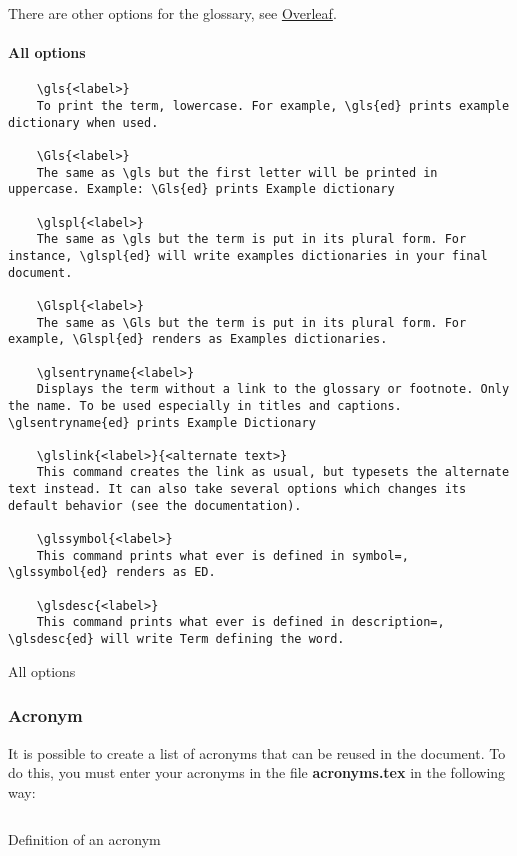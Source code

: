 There are other options for the glossary, see
\href{https://fr.overleaf.com/learn/latex/Glossaries}{Overleaf}.

\paragraph{All options}

\begin{code}
    \begin{verbatim}
    \gls{<label>}
    To print the term, lowercase. For example, \gls{ed} prints example dictionary when used.

    \Gls{<label>}
    The same as \gls but the first letter will be printed in uppercase. Example: \Gls{ed} prints Example dictionary

    \glspl{<label>}
    The same as \gls but the term is put in its plural form. For instance, \glspl{ed} will write examples dictionaries in your final document.

    \Glspl{<label>}
    The same as \Gls but the term is put in its plural form. For example, \Glspl{ed} renders as Examples dictionaries.

    \glsentryname{<label>}
    Displays the term without a link to the glossary or footnote. Only the name. To be used especially in titles and captions. \glsentryname{ed} prints Example Dictionary

    \glslink{<label>}{<alternate text>}
    This command creates the link as usual, but typesets the alternate text instead. It can also take several options which changes its default behavior (see the documentation).

    \glssymbol{<label>}
    This command prints what ever is defined in symbol=, \glssymbol{ed} renders as ED.

    \glsdesc{<label>}
    This command prints what ever is defined in description=, \glsdesc{ed} will write Term defining the word.
    \end{verbatim}
    \caption{All options}
\end{code}

\subsubsection{Acronym} \label{acronym}
It is possible to create a list of acronyms that can be reused in the document.
To do this, you must enter your acronyms in the file \textbf{acronyms.tex} in the following way:
\begin{code}
    \inputminted{latex}{./acronyms.tex}
    \caption{Definition of an acronym}
\end{code}

